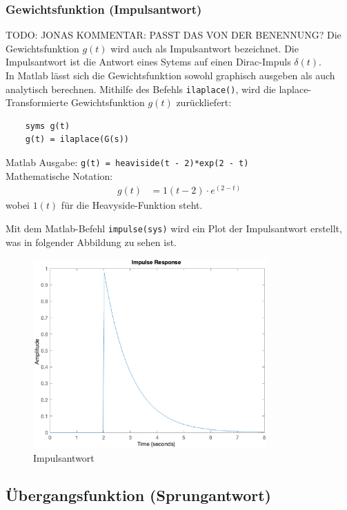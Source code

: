 \subsubsection{Gewichtsfunktion (Impulsantwort)}
TODO: JONAS KOMMENTAR: PASST DAS VON DER BENENNUNG?
Die Gewichtsfunktion $g(t)$ wird auch als Impulsantwort bezeichnet.
Die Impulsantwort ist die Antwort eines Sytems auf einen Dirac-Impuls $\delta(t)$.\\
In Matlab lässt sich die Gewichtsfunktion sowohl graphisch ausgeben als auch analytisch berechnen.
Mithilfe des Befehls \texttt{ilaplace()}, wird die laplace-Transformierte  Gewichtsfunktion $g(t)$ zurückliefert:
\begin{verbatim}
    syms g(t)
    g(t) = ilaplace(G(s))
\end{verbatim}

Matlab Ausgabe: \texttt{g(t) = heaviside(t - 2)*exp(2 - t)}\\
Mathematische Notation: 
\begin{align*}
    g(t) &=1(t-2)\cdot e^{(2-t)}
\end{align*} wobei $1(t)$ für die Heavyside-Funktion steht.

Mit dem Matlab-Befehl \texttt{impulse(sys)} wird ein Plot der Impulsantwort erstellt, was in folgender Abbildung zu sehen ist. 

\begin{figure}[H]
    \label{fig:impuls}
    \centering
    \includegraphics[width=0.8\textwidth]{Bilder/ImpulsAntwortPT1Tt.eps}
    \caption{Impulsantwort}
 \end{figure}

\subsection{Übergangsfunktion (Sprungantwort)}

